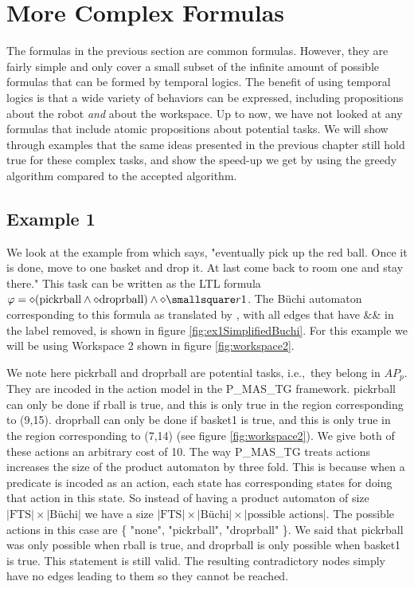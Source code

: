 \chapter{More Complex Formulas}
The formulas in the previous section are common formulas. However, they are fairly simple and only cover a small subset of the infinite amount of possible formulas that can be formed by temporal logics. The benefit of using temporal logics is that a wide variety of behaviors can be expressed, including propositions about the robot \textit{and} about the workspace. Up to now, we have not looked at any formulas that include atomic propositions about potential tasks. We will show through examples that the same ideas presented in the previous chapter still hold true for these complex tasks, and show the speed-up we get by using the greedy algorithm compared to the accepted algorithm. 

\section{Example 1}
We look at the example from \cite{guo15} which says, "eventually pick up the red ball. Once it is done, move to one basket and drop it. At last come back to room one and stay there." This task can be written as the LTL formula $\varphi = \diamond (\text{pickrball} \wedge \diamond \text{droprball}) \wedge \diamond \smallsquare r1$. The B\"uchi automaton corresponding to this formula as translated by \cite{ltlbuchiwebsite}, with all edges that have \&\& in the label removed, is shown in figure \ref{fig:ex1SimplifiedBuchi}. For this example we will be using Workspace 2 shown in figure \ref{fig:workspace2}.

We note here pickrball and droprball are potential tasks, i.e.,\ they belong in $AP_p$. They are incoded in the action model in the P\_MAS\_TG framework. pickrball can only be done if rball is true, and this is only true in the region corresponding to (9,15).  droprball can only be done if basket1 is true, and this is only true in the region corresponding to (7,14) (see figure \ref{fig:workspace2}). We give both of these actions an arbitrary cost of 10. The way P\_MAS\_TG treats actions increases the size of the product automaton by three fold. This is because when a predicate is incoded as an action, each state has corresponding states for doing that action in this state. So instead of having a product automaton of size $|\text{FTS}| \times |\text{B\"uchi}| $ we have a size $|\text{FTS}| \times |\text{B\"uchi}| \times |\text{possible actions}|$. The possible actions in this case are \{ "none", "pickrball", "droprball" \}. We said that pickrball was only possible when rball is true, and droprball is only possible when basket1 is true. This statement is still valid. The resulting contradictory nodes simply have no edges leading to them so they cannot be reached. 


